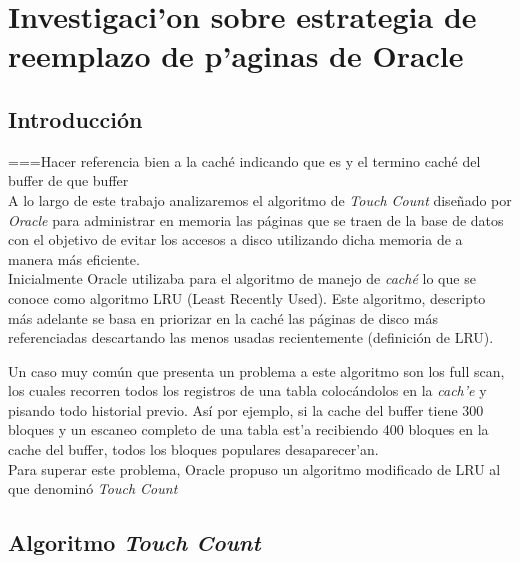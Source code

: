 \documentclass[11pt, a4paper, spanish]{article}
\newenvironment{borde}[1]
{\begin{lrbox}{\fmbox}\begin{minipage}{#1}}
{\end{minipage}\end{lrbox}\fbox{\usebox{\fmbox}}\\[10pt]}
\begin{document}


\newpage 
\section{Investigaci'on sobre estrategia de reemplazo de p'aginas de Oracle}

\subsection{Introducci\'on}

===Hacer referencia bien a la caché indicando que es y el termino caché del buffer de que buffer\\

A lo largo de este trabajo analizaremos el algoritmo de \textit{Touch Count} dise\~{n}ado por \textit{Oracle} para administrar en memoria las p\'aginas que se
traen de la base de datos con el objetivo de evitar los accesos a disco utilizando dicha memoria de a manera m\'as eficiente.\\

Inicialmente Oracle utilizaba para el algoritmo de manejo de \textit{cach\'e} lo que se conoce como algoritmo LRU (Least Recently Used). Este algoritmo, 
descripto m\'as adelante se basa en priorizar en la cach\'e las p\'aginas de disco m\'as referenciadas descartando las menos usadas recientemente 
(definici\'on de LRU).

Un caso muy com\'un que presenta un problema a este algoritmo son los full scan, los cuales recorren todos los registros de una tabla coloc\'andolos en 
la \textit{cach'e} y pisando todo historial previo. As\'i por ejemplo, si la cache del buffer tiene 300 bloques y un escaneo completo de una 
tabla est'a recibiendo 400 bloques en la cache del buffer, todos los bloques populares desaparecer'an. \\

Para superar este problema, Oracle propuso un algoritmo modificado de LRU al que denomin\'o \textit{Touch Count}
  
\subsection{Algoritmo \textit{Touch Count}}
\end{document}

